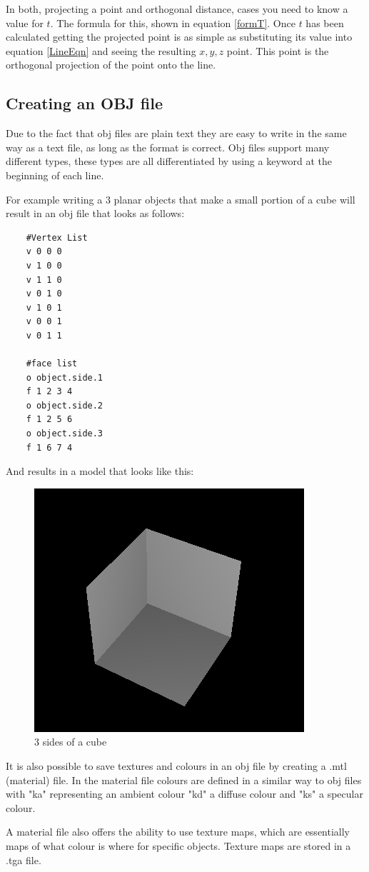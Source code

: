 	In both, projecting a point and orthogonal distance, cases you need to know a value for $t$. The formula for this, shown in equation \ref{formT}. Once $t$ has been calculated getting the projected point is as simple as substituting its value into equation \ref{LineEqn} and seeing the resulting $x,y,z$ point. This point is the orthogonal projection of the point onto the line.
	
	\subsection{Creating an OBJ file}
	\label{makeOBJfile}
	Due to the fact that obj files are plain text they are easy to write in the same way as a text file, as long as the format is correct. Obj files support many different types, these types are all differentiated by using a keyword at the beginning of each line. 
	
	For example writing a 3 planar objects that make a small portion of a cube will result in an obj file that looks as follows:
	\newpage
	\begin{lstlisting}
	#Vertex List
	v 0 0 0
	v 1 0 0
	v 1 1 0
	v 0 1 0
	v 1 0 1
	v 0 0 1
	v 0 1 1

	#face list
	o object.side.1
	f 1 2 3 4
	o object.side.2
	f 1 2 5 6
	o object.side.3
	f 1 6 7 4
	\end{lstlisting}
	And results in a model that looks like this:
	
	
	\begin{figure}[H]
		\centering
		\includegraphics[width=0.5\linewidth]{Includes/images/half-box}
		\caption{3 sides of a cube}
		\label{fig:half-box}
	\end{figure}
	
	It is also possible to save textures and colours in an obj file by creating a .mtl (material) file. In the material file colours are defined in a similar way to obj files with "ka" representing an ambient colour "kd" a diffuse colour and "ks" a specular colour. 
	
	A material file also offers the ability to use texture maps, which are essentially maps of what colour is where for specific objects. Texture maps are stored in a .tga file.
	
	
		

	



